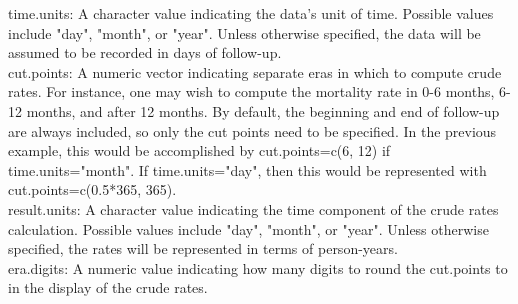 \documentclass{article}
\begin{document}
time.units:  A character value indicating the data's unit of time.  Possible values include "day", "month", or "year".  Unless otherwise specified, the data will be assumed to be recorded in days of follow-up.\\

cut.points:  A numeric vector indicating separate eras in which to compute crude rates.  For instance, one may wish to compute the mortality rate in 0-6 months, 6-12 months, and after 12 months.  By default, the beginning and end of follow-up are always included, so only the cut points need to be specified.  In the previous example, this would be accomplished by cut.points=c(6, 12) if time.units="month".  If time.units="day", then this would be represented with cut.points=c(0.5*365, 365).\\

result.units:  A character value indicating the time component of the crude rates calculation.  Possible values include "day", "month", or "year".  Unless otherwise specified, the rates will be represented in terms of person-years.\\

era.digits:  A numeric value indicating how many digits to round the cut.points to in the display of the crude rates.
\end{document}

